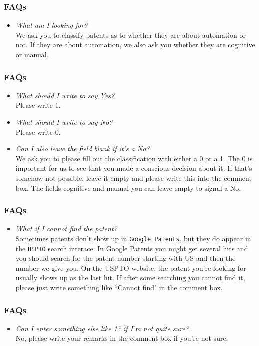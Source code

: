 \documentclass[10pt]{beamer}
\begin{document}
\begin{frame}\frametitle{FAQs}
	\begin{itemize}	
	\item \textit{What am I looking for?}\\[0.1cm]
	We ask you to classify patents as to whether they are about automation or not. If they are about automation, we also ask you whether they are cognitive or manual.
	\end{itemize}
\end{frame}


\begin{frame}\frametitle{FAQs}
	\begin{itemize}	
	\item \textit{What should I write to say Yes?}\\[0.1cm]
	Please write 1.
	\item \textit{What should I write to say No?}\\[0.1cm]
	Please write 0.
	\item \textit{Can I also leave the field blank if it's a No?}\\[0.1cm]
	We ask you to please fill out the classification with either a 0 or a 1. The 0 is important for us to see that you made a conscious decision about it. If that's somehow not possible, leave it empty and please write this into the comment box. The fields cognitive and manual you can leave empty to signal a No.
		\end{itemize}
\end{frame}


\begin{frame}\frametitle{FAQs}
	\begin{itemize}	
	\item \textit{What if I cannot find the patent?}\\[0.1cm]
Sometimes patents don't show up in \href{https://www.google.com/patents}{\texttt{Google Patents}}, but they do appear in the \href{http://patft.uspto.gov/netahtml/PTO/search-bool.html}{\texttt{USPTO}} search interace. In Google Patents you might get several hits and you should search for the patent number starting with US and then the number we give you. On the USPTO website, the patent you're looking for usually shows up as the last hit. If after some searching you cannot find it, please just write something like ``Cannot find" in the comment box.
	\end{itemize}
\end{frame}


\begin{frame}\frametitle{FAQs}
	\begin{itemize}	
	\item \textit{Can I enter something else like 1? if I'm not quite sure?}\\[0.1cm]
	No, please write your remarks in the comment box if you're not sure. 
	\end{itemize}
\end{frame}
\end{document}
